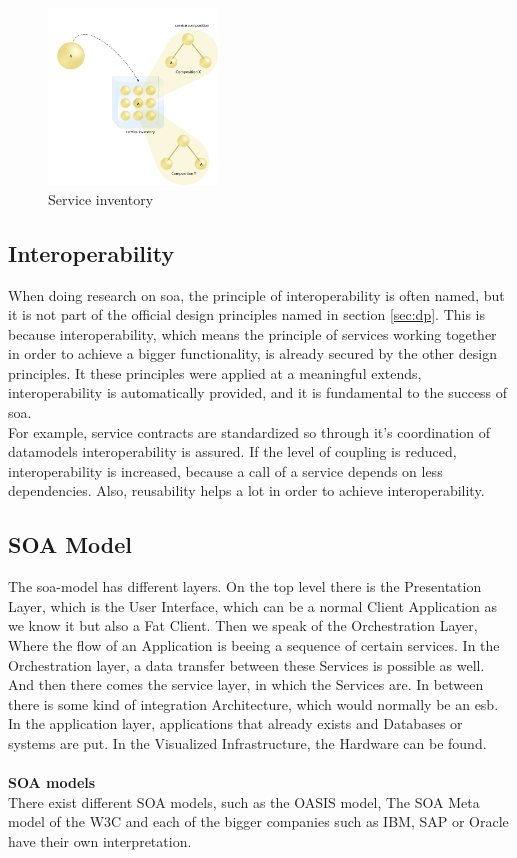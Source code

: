 \documentclass[12pt]{article}
\begin{document}
\begin{figure}[here!]
	\centering
	\includegraphics[width=0.4\textwidth]{images/picservi0}
	\caption{Service inventory\cite{picservi}}
	\label{fig:Serviceinventory}
	\end{figure}
	\FloatBarrier \noindent
\subsection{Interoperability}
When doing research on \gls{soa}, the principle of interoperability is often named, but it is not part of the official design principles named in section \ref{sec:dp}. This is because interoperability, which means the principle of services working together in order to achieve a bigger functionality, is already secured by the other design principles. It these principles were applied at a meaningful extends, interoperability is automatically provided, and it is fundamental to the success of \gls{soa}.\\
For example, service contracts are standardized so through it's coordination of datamodels interoperability is assured. If the level of coupling is reduced, interoperability is increased, because a call of a service depends on less dependencies. Also, reusability helps a lot in order to achieve interoperability. \cite[page 89-90]{te}
\subsection{SOA Model}
The \gls{soa}-model has different layers. On the top level there is the Presentation Layer, which is the User Interface, which can be a normal Client Application as we know it but also a Fat Client. Then we speak of the Orchestration Layer, Where the flow of an Application is beeing a sequence of certain services. In the Orchestration layer, a data transfer between these Services is possible as well. And then there comes the service layer, in which the Services are. In between there is some kind of integration Architecture, which would normally be an \gls{esb}. In the application layer, applications that already exists and Databases or systems are put. In the Visualized Infrastructure, the Hardware can be found. %
\\\\\noindent\textbf{SOA models}\\
There exist different SOA models, such as the OASIS model, The SOA Meta model of the W3C and each of the bigger companies such as IBM, SAP or Oracle have their own interpretation.
\end{document}
